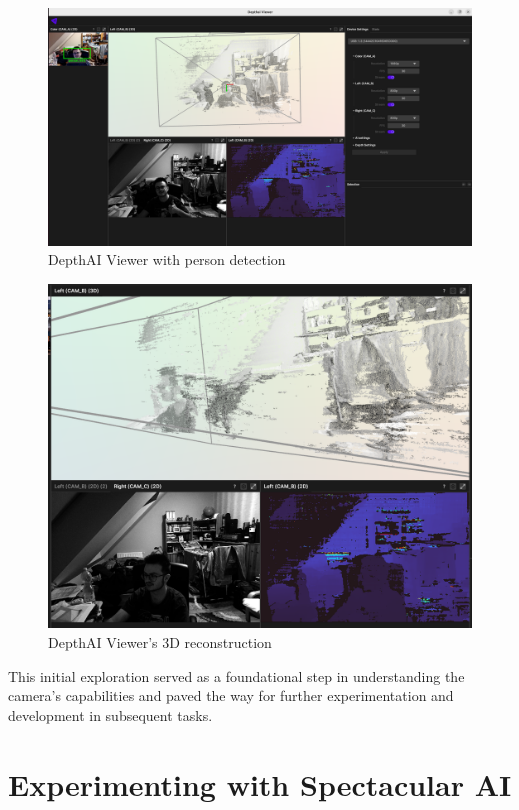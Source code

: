 \begin{figure}[htbp]
	\centering
	\includegraphics[width=150mm, keepaspectratio]{figures/depthai_viewer.png}
	\caption{DepthAI Viewer with person detection}
	\label{fig:DAI_person_detection}
\end{figure}

\begin{figure}[htbp]
	\centering
	\includegraphics[width=150mm, keepaspectratio]{figures/depthai_viewer_3d.png}
	\caption{DepthAI Viewer's 3D reconstruction}
	\label{fig:DAI_3d}
\end{figure}

This initial exploration served as a foundational step in understanding the camera's capabilities and paved the way for further experimentation and development in subsequent tasks.

\section{Experimenting with Spectacular AI}


